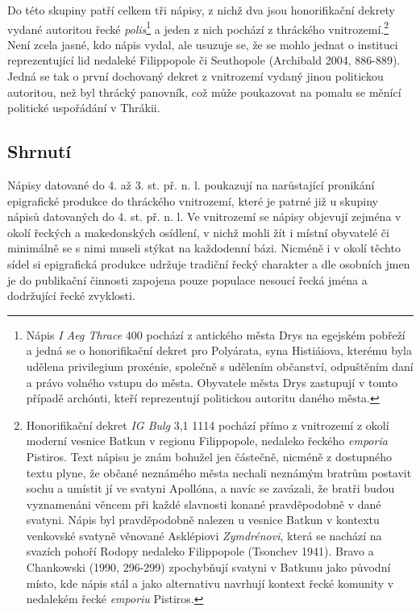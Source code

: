 Do této skupiny patří celkem tři nápisy, z nichž dva jsou honorifikační dekrety vydané autoritou řecké {\em polis}\footnote{Nápis {\em I Aeg Thrace} 400 pochází z antického města Drys na egejském pobřeží a jedná se o honorifikační dekret pro Polyárata, syna Histiáiova, kterému byla udělena privilegium proxénie, společně s udělením občanství, odpuštěním daní a právo volného vstupu do města. Obyvatele města Drys zastupují v tomto případě archónti, kteří reprezentují politickou autoritu daného města.} a jeden z nich pochází z thráckého vnitrozemí.\footnote{Honorifikační dekret {\em IG Bulg} 3,1 1114 pochází přímo z vnitrozemí z okolí moderní vesnice Batkun v regionu Filippopole, nedaleko řeckého {\em emporia} Pistiros. Text nápisu je znám bohužel jen částečně, nicméně z dostupného textu plyne, že občané neznámého města nechali neznámým bratrům postavit sochu a umístit jí ve svatyni Apollóna, a navíc se zavázali, že bratři budou vyznamenáni věncem při každé slavnosti konané pravděpodobně v dané svatyni. Nápis byl pravděpodobně nalezen u vesnice Batkun v kontextu venkovské svatyně věnované Asklépiovi {\em Zymdrénovi}, která se nachází na svazích pohoří Rodopy nedaleko Filippopole (Tsonchev 1941). Bravo a Chankowski (1990, 296-299) zpochybňují svatyni v Batkunu jako původní místo, kde nápis stál a jako alternativu navrhují kontext řecké komunity v nedalekém řecké {\em emporiu} Pistiros.} Není zcela jasné, kdo nápis vydal, ale usuzuje se, že se mohlo jednat o instituci reprezentující lid nedaleké Filippopole či Seuthopole (Archibald 2004, 886-889). Jedná se tak o první dochovaný dekret z vnitrozemí vydaný jinou politickou autoritou, než byl thrácký panovník, což může poukazovat na pomalu se měnící politické uspořádání v Thrákii.

\subsection[shrnutí-8]{Shrnutí}

Nápisy datované do 4. až 3. st. př. n. l. poukazují na narůstající pronikání epigrafické produkce do thráckého vnitrozemí, které je patrné již u skupiny nápisů datovaných do 4. st. př. n. l. Ve vnitrozemí se nápisy objevují zejména v okolí řeckých a makedonských osídlení, v nichž mohli žít i místní obyvatelé či minimálně se s nimi museli stýkat na každodenní bázi. Nicméně i v okolí těchto sídel si epigrafická produkce udržuje tradiční řecký charakter a dle osobních jmen je do publikační činnosti zapojena pouze populace nesoucí řecká jména a dodržující řecké zvyklosti.

